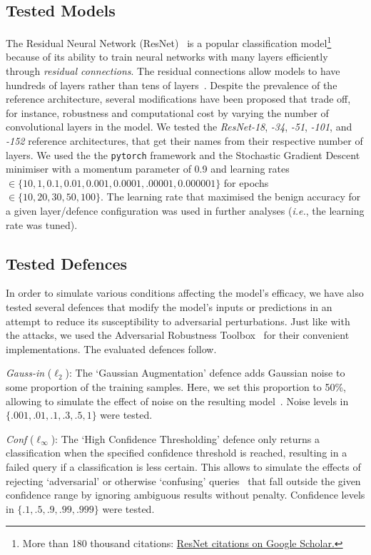 \subsection{Tested Models}
\label{models}

The Residual Neural Network (ResNet)~\cite{resnet} is a popular classification model\footnote{More than 180 thousand citations: \href{https://scholar.google.com/scholar?cites=9281510746729853742}{ResNet citations on Google Scholar.}} because of its ability to train neural networks with many layers efficiently through \textit{residual connections}.
The residual connections allow models to have hundreds of layers rather than tens of layers~\cite{resnet,vgg}. Despite the prevalence of the reference architecture, several modifications have been proposed that trade off, for instance, robustness and computational cost by varying the number of convolutional layers in the model. We tested the \textit{ResNet-18}, \textit{-34}, \textit{-51}, \textit{-101}, and \textit{-152} reference architectures, that get their names from their respective number of layers. We used the the \texttt{pytorch} framework and the Stochastic Gradient Descent minimiser with a momentum parameter of 0.9 and learning rates $\in \{10, 1, 0.1, 0.01, 0.001, 0.0001, .00001, 0.000001\}$ for epochs $\in \{ 10, 20, 30, 50, 100\}$. The learning rate that maximised the benign accuracy for a given layer/defence configuration was used in further analyses (\textit{i.e.}, the learning rate was tuned).

\subsection{Tested Defences}
\label{defences}

In order to simulate various conditions affecting the model's efficacy, we have also tested several defences that modify the model's inputs or predictions in an attempt to reduce its susceptibility to adversarial perturbations. Just like with the attacks, we used the Adversarial Robustness Toolbox~\cite{art2018} for their convenient implementations. The evaluated defences follow.


\textit{Gauss-in} ($\ell_2$): The `Gaussian Augmentation' defence adds Gaussian noise to some proportion of the training samples. Here, we set this proportion to 50\%, allowing to simulate the effect of noise on the resulting model~\cite{gauss_aug}. Noise levels in $\{.001, .01, .1, .3, .5, 1\}$ were tested.


\textit{Conf} ($\ell_{\infty}$): The `High Confidence Thresholding' defence only returns a classification when the specified confidence threshold is reached, resulting in a failed query if a classification is less certain. This allows to simulate the effects of rejecting `adversarial' or otherwise `confusing' queries~\cite{high_conf} that fall outside the given confidence range by ignoring ambiguous results without penalty. Confidence levels in $\{.1, .5, .9, .99, .999\}$ were tested.


